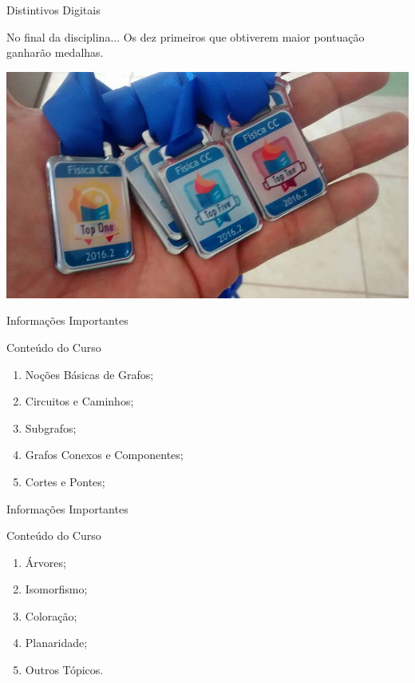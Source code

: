\documentclass[xcolor=dvipsnames,table]{beamer}
\begin{document}
	\begin{frame}{Distintivos Digitais}
		\begin{exampleblock}{No final da disciplina...}
			Os dez primeiros que obtiverem maior pontuação ganharão medalhas.
		\end{exampleblock} \pause
		\begin{center}
			\includegraphics[height=.6\textheight]{images/badges/medalhas}
		\end{center}
	\end{frame}

	\begin{frame}{Informações Importantes}
		\begin{block}{Conteúdo do Curso}
			\begin{enumerate}
				\item Noções Básicas de Grafos;
				\item Circuitos e Caminhos;
				\item Subgrafos;
				\item Grafos Conexos e Componentes;
				\item Cortes e Pontes;
			\end{enumerate}
		\end{block}
	\end{frame}
	
	\begin{frame}{Informações Importantes}
		\begin{block}{Conteúdo do Curso}
			\begin{enumerate}
				\item Árvores;
				\item Isomorfismo;
				\item Coloração;
				\item Planaridade;				
				\item Outros Tópicos.
			\end{enumerate}
		\end{block}
	\end{frame}
\end{document}
